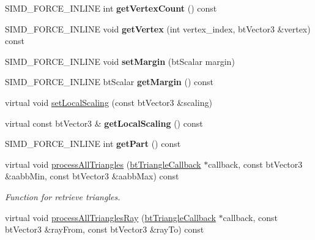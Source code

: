 \begin{DoxyCompactItemize}
\item 
\mbox{\label{classbtGImpactMeshShapePart_a1f769ae0853fc7f336481b3b9be5cdef}} 
S\+I\+M\+D\+\_\+\+F\+O\+R\+C\+E\+\_\+\+I\+N\+L\+I\+NE int {\bfseries get\+Vertex\+Count} () const
\item 
\mbox{\label{classbtGImpactMeshShapePart_a40427b8e3fdfcc490b08f580a9199ee5}} 
S\+I\+M\+D\+\_\+\+F\+O\+R\+C\+E\+\_\+\+I\+N\+L\+I\+NE void {\bfseries get\+Vertex} (int vertex\+\_\+index, bt\+Vector3 \&vertex) const
\item 
\mbox{\label{classbtGImpactMeshShapePart_a6f77efd41c832e436bfd6cca7d3269e7}} 
S\+I\+M\+D\+\_\+\+F\+O\+R\+C\+E\+\_\+\+I\+N\+L\+I\+NE void {\bfseries set\+Margin} (bt\+Scalar margin)
\item 
\mbox{\label{classbtGImpactMeshShapePart_ad6ad76f22c8d08c71fda98b53ab2ce4d}} 
S\+I\+M\+D\+\_\+\+F\+O\+R\+C\+E\+\_\+\+I\+N\+L\+I\+NE bt\+Scalar {\bfseries get\+Margin} () const
\item 
virtual void \hyperlink{classbtGImpactMeshShapePart_a2c1de297d020a75e1ab0f10f7c71478f}{set\+Local\+Scaling} (const bt\+Vector3 \&scaling)
\item 
\mbox{\label{classbtGImpactMeshShapePart_af0428a406356b3c9b157efc4a5116a79}} 
virtual const bt\+Vector3 \& {\bfseries get\+Local\+Scaling} () const
\item 
\mbox{\label{classbtGImpactMeshShapePart_a0b9a1dbcc0acd7a3082b2dbfbc5ef5d5}} 
S\+I\+M\+D\+\_\+\+F\+O\+R\+C\+E\+\_\+\+I\+N\+L\+I\+NE int {\bfseries get\+Part} () const
\item 
virtual void \hyperlink{classbtGImpactMeshShapePart_a040a65abd0627d83ecd8bb73be43383e}{process\+All\+Triangles} (\hyperlink{classbtTriangleCallback}{bt\+Triangle\+Callback} $\ast$callback, const bt\+Vector3 \&aabb\+Min, const bt\+Vector3 \&aabb\+Max) const
\begin{DoxyCompactList}\small\item\em Function for retrieve triangles. \end{DoxyCompactList}\item 
virtual void \hyperlink{classbtGImpactMeshShapePart_a63c6db1d4458384ef776784a79eaf8f8}{process\+All\+Triangles\+Ray} (\hyperlink{classbtTriangleCallback}{bt\+Triangle\+Callback} $\ast$callback, const bt\+Vector3 \&ray\+From, const bt\+Vector3 \&ray\+To) const

\end{DoxyCompactItemize}
